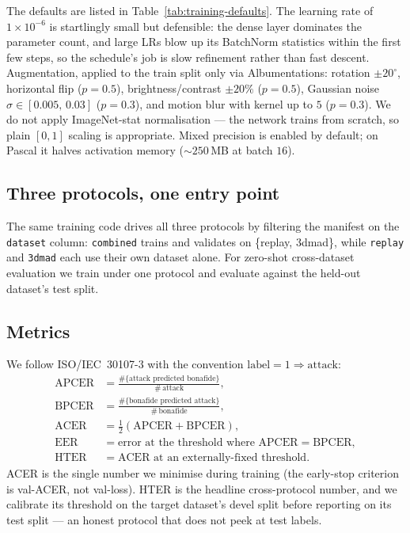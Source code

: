 \documentclass[anonymous, manuscript, screen, review]{acmart}
\begin{document}
The defaults are listed in Table~\ref{tab:training-defaults}. The
learning rate of $1\!\times\!10^{-6}$ is startlingly small but
defensible: the dense layer dominates the parameter count, and large
LRs blow up its BatchNorm statistics within the first few steps, so the
schedule's job is slow refinement rather than fast descent.
Augmentation, applied to the train split only via Albumentations:
rotation $\pm 20^\circ$, horizontal flip ($p\!=\!0{.}5$),
brightness/contrast $\pm 20\%$ ($p\!=\!0{.}5$), Gaussian noise
$\sigma \in [0{.}005,\,0{.}03]$ ($p\!=\!0{.}3$), and motion blur with
kernel up to $5$ ($p\!=\!0{.}3$). We do not apply ImageNet-stat
normalisation --- the network trains from scratch, so plain $[0,1]$
scaling is appropriate. Mixed precision is enabled by default; on
Pascal it halves activation memory ($\sim$$250$\,MB at batch $16$).

\subsection{Three protocols, one entry point}

The same training code drives all three protocols by filtering the
manifest on the \texttt{dataset} column: \texttt{combined} trains and
validates on \{replay, 3dmad\}, while \texttt{replay} and \texttt{3dmad}
each use their own dataset alone. For zero-shot cross-dataset evaluation
we train under one protocol and evaluate against the held-out dataset's
test split.

\subsection{Metrics}

We follow ISO/IEC~30107-3 \cite{iso301073} with the convention
$\text{label}=1\Rightarrow\text{attack}$:
\begin{align}
\text{APCER} &= \tfrac{\#\{\text{attack predicted bonafide}\}}{\#\,\text{attack}}, \\
\text{BPCER} &= \tfrac{\#\{\text{bonafide predicted attack}\}}{\#\,\text{bonafide}}, \\
\text{ACER}  &= \tfrac{1}{2}(\text{APCER}+\text{BPCER}), \\
\text{EER}   &= \text{error at the threshold where APCER}=\text{BPCER}, \\
\text{HTER}  &= \text{ACER at an externally-fixed threshold}.
\end{align}
ACER is the single number we minimise during training (the early-stop
criterion is val-ACER, not val-loss). HTER is the headline
cross-protocol number, and we calibrate its threshold on the target
dataset's devel split before reporting on its test split --- an honest
protocol that does not peek at test labels.
\end{document}

